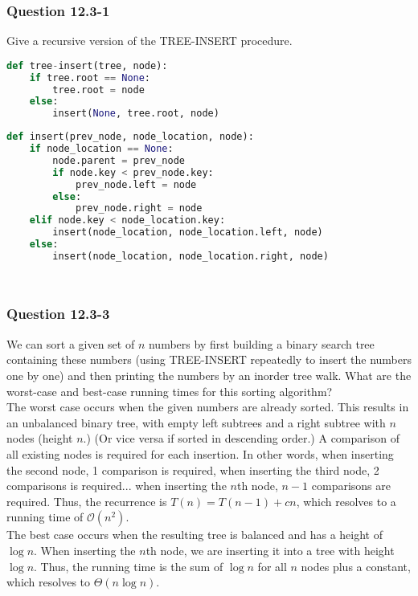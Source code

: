 \documentclass[11pt]{article}
\begin{document}
\subsubsection*{Question 12.3-1}\nointerlineskip
Give a recursive version of the TREE-INSERT procedure.\\

\begin{minipage}{6in}
\begin{lstlisting}[language=Python]
def tree-insert(tree, node):
    if tree.root == None:
        tree.root = node
    else:
        insert(None, tree.root, node)
\end{lstlisting}
\end{minipage}

\begin{minipage}{6in}
\begin{lstlisting}[language=Python]
def insert(prev_node, node_location, node):
    if node_location == None:
        node.parent = prev_node
        if node.key < prev_node.key:
            prev_node.left = node
        else:
            prev_node.right = node
    elif node.key < node_location.key:
        insert(node_location, node_location.left, node)
    else:
        insert(node_location, node_location.right, node)
    
 
\end{lstlisting}
\end{minipage}

\subsubsection*{Question 12.3-3}\nointerlineskip
We can sort a given set of $n$ numbers by first building a binary search tree containing these numbers (using TREE-INSERT repeatedly to insert the numbers one by one) and then printing the numbers by an inorder tree walk. What are the worst-case and best-case running times for this sorting algorithm?\\

The worst case occurs when the given numbers are already sorted. This results in an unbalanced binary tree, with empty left subtrees and a right subtree with $n$ nodes (height $n$.) (Or vice versa if sorted in descending order.)  A comparison of all existing nodes is required for each insertion. In other words, when inserting the second node, 1 comparison is required, when inserting the third node, 2 comparisons is required... when inserting the $n$th node, $n-1$ comparisons are required. Thus, the recurrence is $T(n) = T(n-1)+ cn$, which resolves to a running time of $\mathcal{O}(n^2)$. \\

The best case occurs when the resulting tree is balanced and has a height of $\log n$. When inserting the $n$th node, we are inserting it into a tree with height $\log n$. Thus, the running time is the sum of $\log n$ for all $n$ nodes plus a constant, which resolves to $\Theta(n \log n)$.\\
\end{document}
